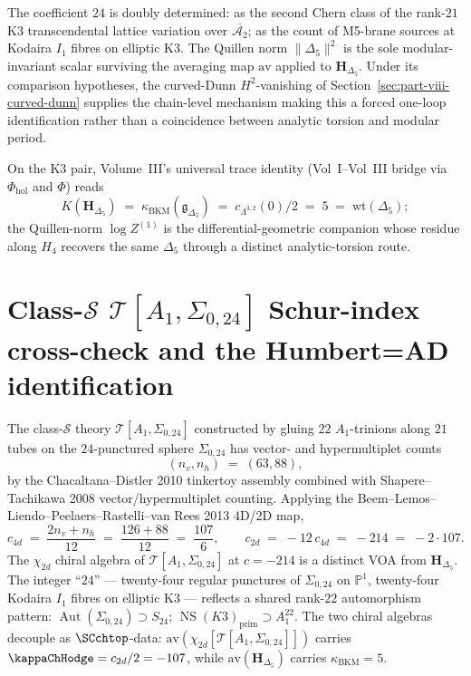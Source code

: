 The coefficient $24$ is doubly determined: as the second Chern class
of the rank-$21$ K3 transcendental lattice variation over
$\overline{\mathcal{A}_2}$; as the count of M5-brane sources at
Kodaira $I_1$ fibres on elliptic K3. The Quillen norm $\|\Delta_5\|^2$
is the sole modular-invariant scalar surviving the averaging map
$\mathrm{av}$ applied to $\mathbf{H}_{\Delta_5}$. Under its comparison
hypotheses, the curved-Dunn $H^2$-vanishing of
Section~\ref{sec:part-viii-curved-dunn} supplies the chain-level
mechanism making this a forced one-loop identification rather than a
coincidence between analytic torsion and modular period.

On the K3 pair, Volume~III's universal trace identity (Vol~I--Vol~III
bridge via $\Phi_{\mathrm{hol}}$ and $\Phi$) reads
\[
K(\mathbf{H}_{\Delta_5})
\;=\;
\kappa_{\mathrm{BKM}}(\mathfrak{g}_{\Delta_5})
\;=\;
c_{\Lambda^{3,2}}(0)/2
\;=\;
5
\;=\;
\mathrm{wt}(\Delta_5);
\]
the Quillen-norm $\log Z^{(1)}$ is the differential-geometric companion
whose residue along $H_4$ recovers the same $\Delta_5$ through a
distinct analytic-torsion route.

\section{Class-$\mathcal{S}$ $\mathcal{T}[A_1,\Sigma_{0,24}]$ Schur-index
cross-check and the Humbert=AD identification}
\label{sec:part-viii-schur-humbert}

The class-$\mathcal{S}$ theory
$\mathcal{T}[A_1, \Sigma_{0,24}]$ constructed by gluing $22$
$A_1$-trinions along $21$ tubes on the $24$-punctured sphere
$\Sigma_{0,24}$ has vector- and hypermultiplet counts
\[
(n_v, n_h)
\;=\;
(63, 88),
\]
by the Chacaltana--Distler 2010 tinkertoy assembly combined with
Shapere--Tachikawa 2008 vector/hypermultiplet counting. Applying the
Beem--Lemos--Liendo--Peelaers--Rastelli--van Rees 2013 4D/2D map,
\[
c_{4d}
\;=\;
\frac{2n_v + n_h}{12}
\;=\;
\frac{126+88}{12}
\;=\;
\frac{107}{6},
\qquad
c_{2d}
\;=\;
-12\,c_{4d}
\;=\;
-214
\;=\;
-2\cdot 107.
\]
The $\chi_{2d}$ chiral algebra of $\mathcal{T}[A_1,\Sigma_{0,24}]$ at
$c = -214$ is a distinct VOA from $\mathbf{H}_{\Delta_5}$. The
integer ``$24$'' — twenty-four regular punctures of $\Sigma_{0,24}$
on $\mathbb{P}^1$, twenty-four Kodaira $I_1$ fibres on elliptic K3 —
reflects a shared rank-$22$ automorphism pattern:
$\operatorname{Aut}(\Sigma_{0,24})\supset S_{24}$;
$\operatorname{NS}(K3)_{\mathrm{prim}}\supset A_1^{22}$. The two chiral
algebras decouple as $\SCchtop$-data:
$\mathrm{av}(\chi_{2d}[\mathcal{T}[A_1,\Sigma_{0,24}]])$ carries
$\kappaChHodge = c_{2d}/2 = -107$, while
$\mathrm{av}(\mathbf{H}_{\Delta_5})$ carries $\kappa_{\mathrm{BKM}} = 5$.

